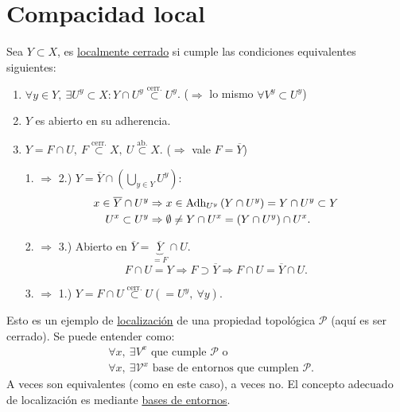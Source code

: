 \chapter{Compacidad local}%
\label{cha:compacidad_local}
\begin{defi}
Sea $Y \subset X$, es \underline{localmente cerrado} si cumple las condiciones equivalentes siguientes:
\begin{enumerate}
    \item $\forall y \in Y,\ \exists U^y \subset X: Y \cap U^y \stackrel{\text{cerr.}}{\subset} U^y$. ($\Rightarrow$ lo mismo $\forall V^y \subset U^y$)
    \item $Y$ es abierto en su adherencia.
    \item $Y = F \cap U,\ F \stackrel{\text{cerr.}}{\subset} X,\ U \stackrel{\text{ab.}}{\subset} X$. ($\Rightarrow$ vale $F = \overline{Y}$)
\end{enumerate}
\end{defi}
\begin{demo}
\begin{enumerate}
    \item[1. $\Rightarrow$ 2.)] $Y = \overline{Y} \cap \left( \bigcup_{y \in Y} U^y \right)$:
    \begin{align*}
        x \in \overline{Y} \cap U^y &\Rightarrow x \in \operatorname{Adh}_{U^y} \left( Y \cap U^y \right) = Y \cap U^y \subset Y\\
        U^x \subset U^y &\Rightarrow \emptyset \neq Y \cap U^x = \left( Y \cap U^y \right) \cap U^x
    .\end{align*}
    \item[2. $\Rightarrow$ 3.)] Abierto en $\overline{Y} = \underbrace{\overline{Y}}_{= F} \cap U$.
    \[
    F \cap U = Y \Rightarrow F \supset \overline{Y} \Rightarrow F \cap U = \overline{Y} \cap U.
    \]
    \item[3. $\Rightarrow$ 1.)] $Y = F \cap U \stackrel{\text{cerr.}}{\subset} U \left( = U^y,\ \forall y \right)$.
\end{enumerate}
\end{demo}

Esto es un ejemplo de \underline{localización} de una propiedad topológica $\mathcal{P}$ (aquí es ser cerrado). Se puede entender como:
\begin{align*}
    &\forall x,\ \exists V^x \text{ que cumple } \mathcal{P} \text{ o } \\
    &\forall x,\ \exists \mathcal{V}^x \text{ base de entornos que cumplen } \mathcal{P} 
.\end{align*}
A veces son equivalentes (como en este caso), a veces no. El concepto adecuado de localización es mediante \underline{bases de entornos}.

